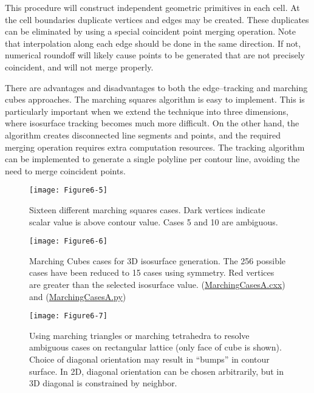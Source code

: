 This procedure will construct independent geometric primitives in each cell. At the cell boundaries duplicate vertices and edges may be created. These duplicates can be eliminated by using a special coincident point merging operation. Note that interpolation along each edge should be done in the same direction. If not, numerical roundoff will likely cause points to be generated that are not precisely coincident, and will not merge properly.

There are advantages and disadvantages to both the edge--tracking and marching cubes approaches. The marching squares algorithm is easy to implement. This is particularly important when we extend the technique into three dimensions, where isosurface tracking becomes much more difficult. On the other hand, the algorithm creates disconnected line segments and points, and the required merging operation requires extra computation resources. The tracking algorithm can be implemented to generate a single polyline per contour line, avoiding the need to merge coincident points.

\begin{figure}[!htb]
\centering
\texttt{[image: Figure6-5]}\\
\caption{ Sixteen different marching squares cases. Dark vertices indicate scalar value is above contour value. Cases 5 and 10 are ambiguous.}
\label{fig:Figure6-5}
\end{figure}


\begin{figure}[!htb]
	\centering
	\texttt{[image: Figure6-6]}\\
	\caption{Marching Cubes cases for 3D isosurface generation. The 256 possible cases have been reduced to 15 cases using symmetry. Red vertices are greater than the selected isosurface value. (\href{https://lorensen.github.io/VTKExamples/site/Cxx/VisualizationAlgorithms/MarchingCasesA/}{MarchingCasesA.cxx}) and (\href{https://lorensen.github.io/VTKExamples/site/Python/VisualizationAlgorithms/MarchingCasesA/}{MarchingCasesA.py})}
	\label{fig:Figure6-6}
\end{figure}


\begin{figure}[!htb]
	\centering
	\texttt{[image: Figure6-7]}\\
	\caption{Using marching triangles or marching tetrahedra to resolve ambiguous cases on rectangular lattice (only face of cube is shown). Choice of diagonal orientation may result in ``bumps'' in contour surface. In 2D, diagonal orientation can be chosen arbitrarily, but in 3D diagonal is constrained by neighbor.}
	\label{fig:Figure6-7}
\end{figure}

